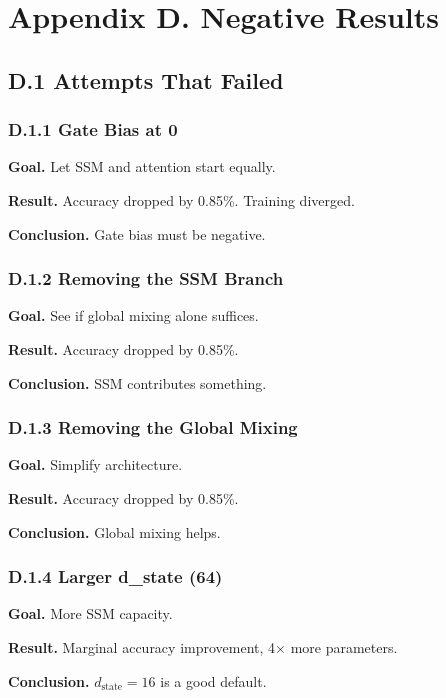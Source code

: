 
\section{Appendix D. Negative Results}

\subsection{D.1 Attempts That Failed}

\subsubsection{D.1.1 Gate Bias at 0}

\textbf{Goal.} Let SSM and attention start equally.

\textbf{Result.} Accuracy dropped by 0.85\%. Training diverged.

\textbf{Conclusion.} Gate bias must be negative.

\subsubsection{D.1.2 Removing the SSM Branch}

\textbf{Goal.} See if global mixing alone suffices.

\textbf{Result.} Accuracy dropped by 0.85\%.

\textbf{Conclusion.} SSM contributes something.

\subsubsection{D.1.3 Removing the Global Mixing}

\textbf{Goal.} Simplify architecture.

\textbf{Result.} Accuracy dropped by 0.85\%.

\textbf{Conclusion.} Global mixing helps.

\subsubsection{D.1.4 Larger d\_state (64)}

\textbf{Goal.} More SSM capacity.

\textbf{Result.} Marginal accuracy improvement, 4$\times$ more parameters.

\textbf{Conclusion.} $d_\text{state} = 16$ is a good default.

